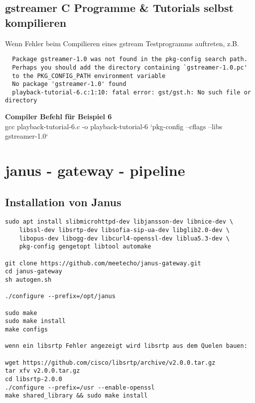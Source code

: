 \subsection{gstreamer C Programme \& Tutorials selbst kompilieren}

Wenn Fehler beim Compilieren eines gstream Testprogramms auftreten, z.B.
\begin{verbatim}
  Package gstreamer-1.0 was not found in the pkg-config search path.
  Perhaps you should add the directory containing `gstreamer-1.0.pc'
  to the PKG_CONFIG_PATH environment variable
  No package 'gstreamer-1.0' found
  playback-tutorial-6.c:1:10: fatal error: gst/gst.h: No such file or directory
\end{verbatim}

\textbf{Compiler Befehl für Beispiel 6}\\
gcc playback-tutorial-6.c -o playback-tutorial-6 `pkg-config --cflags --libs gstreamer-1.0`

\section{janus - gateway - pipeline}

\subsection{Installation von Janus}
\begin{verbatim}
sudo apt install slibmicrohttpd-dev libjansson-dev libnice-dev \
	libssl-dev libsrtp-dev libsofia-sip-ua-dev libglib2.0-dev \
	libopus-dev libogg-dev libcurl4-openssl-dev liblua5.3-dev \
	pkg-config gengetopt libtool automake

git clone https://github.com/meetecho/janus-gateway.git
cd janus-gateway
sh autogen.sh

./configure --prefix=/opt/janus

sudo make 
sudo make install 
make configs

wenn ein libsrtp Fehler angezeigt wird libsrtp aus dem Quelen bauen:

wget https://github.com/cisco/libsrtp/archive/v2.0.0.tar.gz
tar xfv v2.0.0.tar.gz
cd libsrtp-2.0.0
./configure --prefix=/usr --enable-openssl
make shared_library && sudo make install
\end{verbatim}

